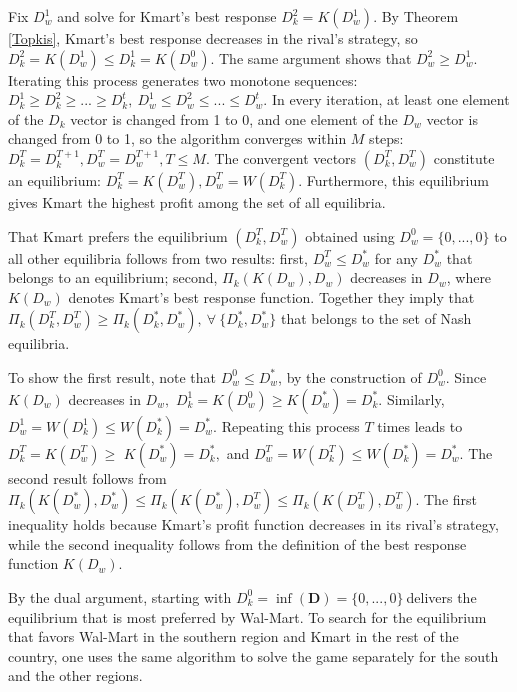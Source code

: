 \documentclass[notitlepage,onecolumn,11pt]{article}
\begin{document}
Fix $D_{w}^{1}$ and solve for Kmart's best response $D_{k}^{2}=K(D_{w}^{1}).$
By Theorem \ref{Topkis}, Kmart's best response decreases in the rival's
strategy, so $D_{k}^{2}=K(D_{w}^{1})\leq D_{k}^{1}=K(D_{w}^{0}).$ The same
argument shows that $D_{w}^{2}\geq D_{w}^{1}.$ Iterating this process
generates two monotone sequences: $D_{k}^{1}\geq D_{k}^{2}\geq ...\geq
D_{k}^{t},~D_{w}^{1}\leq D_{w}^{2}\leq ...\leq D_{w}^{t}.$ In every
iteration, at least one element of the $D_{k}$ vector is changed from 1 to
0, and one element of the $D_{w}$ vector is changed from 0 to 1, so the
algorithm converges within $M$ steps: $%
D_{k}^{T}=D_{k}^{T+1},D_{w}^{T}=D_{w}^{T+1},T\leq M.$ The convergent vectors 
$(D_{k}^{T},D_{w}^{T})$ constitute an equilibrium: $%
D_{k}^{T}=K(D_{w}^{T}),D_{w}^{T}=W(D_{k}^{T}).$ Furthermore, this
equilibrium gives Kmart the highest profit among the set of all equilibria.

That Kmart prefers the equilibrium $(D_{k}^{T},D_{w}^{T})$ obtained using $%
D_{w}^{0}=\{0,...,0\}$ to all other equilibria follows from two results:
first, $D_{w}^{T}\leq D_{w}^{\mathbf{\ast }}$ for any $D_{w}^{\mathbf{\ast }%
} $ that belongs to an equilibrium; second, $\Pi _{k}(K(D_{w}),D_{w})$
decreases in $D_{w}$, where $K(D_{w})$ denotes Kmart's best response
function. Together they imply that $\Pi _{k}(D_{k}^{T},D_{w}^{T})\geq \Pi
_{k}(D_{k}^{\ast },D_{w}^{\ast }),~\forall ~\{D_{k}^{\ast },D_{w}^{\ast }\}$
that belongs to the set of Nash equilibria.

To show the first result, note that $D_{w}^{0}\leq D_{w}^{\ast }$, by the
construction of $D_{w}^{0}$. Since $K(D_{w})$ decreases in $D_{w},$ $%
D_{k}^{1}=K(D_{w}^{0})\geq K(D_{w}^{\ast })=D_{k}^{\ast }.$ Similarly, $%
D_{w}^{1}=W(D_{k}^{1})\leq W(D_{k}^{\ast })=D_{w}^{\ast }.$ Repeating this
process $T$ times leads to $D_{k}^{T}=K(D_{w}^{T})\geq $ $K(D_{w}^{\ast
})=D_{k}^{\ast },$ and $D_{w}^{T}=W(D_{k}^{T})\leq W(D_{k}^{\ast
})=D_{w}^{\ast }.$ The second result follows from $\Pi _{k}(K(D_{w}^{\ast
}),D_{w}^{\ast })\leq \Pi _{k}(K(D_{w}^{\ast }),D_{w}^{T})\leq \Pi
_{k}(K(D_{w}^{T}),D_{w}^{T}).$ The first inequality holds because Kmart's
profit function decreases in its rival's strategy, while the second
inequality follows from the definition of the best response function $%
K(D_{w}).$

By the dual argument, starting with $D_{k}^{0}=\inf (\mathbf{D}%
)=\{0,...,0\}\ $delivers the equilibrium that is most preferred by Wal-Mart.
To search for the equilibrium that favors Wal-Mart in the southern region
and Kmart in the rest of the country, one uses the same algorithm to solve
the game separately for the south and the other regions.
\end{document}
